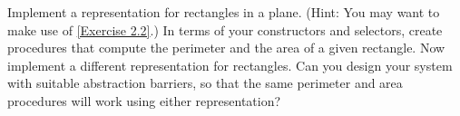 \begin{exercise}
	\label{Exercise 2.3}
	Implement a representation for rectangles in a plane.
	(Hint: You may want to make use of \cref{Exercise 2.2}.)
	In terms of your constructors and selectors, create procedures that compute the perimeter and the area of a given rectangle.
	Now implement a different representation for rectangles.
	Can you design your system with suitable abstraction barriers, so that the same perimeter and area procedures will work using either representation?
\end{exercise}
